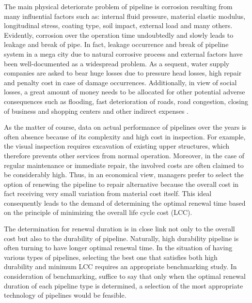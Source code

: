 \documentclass[a4paper,oneside,onecolumn,preprint,10pt,authoryear]{elsarticle}
\begin{document}
The main physical deteriorate problem of pipeline is corrosion resulting from many influential factors such as: internal fluid pressure, material elastic modulus, longitudinal stress, coating type, soil impact, external load and many others. Evidently, corrosion over the operation time undoubtedly and slowly leads to leakage and break of pipe. In fact, leakage occurrence and break of pipeline system in a mega city due to natural corrosive process and external factors have been well-documented as a widespread problem. As a sequent, water supply companies are asked to bear huge losses due to pressure head losses, high repair and penalty cost in case of damage occurrences. Additionally, in view of social losses, a great amount of money needs to be allocated for other potential adverse consequences such as flooding, fast deterioration of roads, road congestion, closing of business and shopping centers and other indirect expenses \cite{deb03}.

As the matter of course, data on actual performance of pipelines over the years is often absence because of its complexity and high cost in inspection. For example, the visual inspection requires excavation of existing upper structures, which therefore prevents other services from normal operation. Moreover, in the case of regular maintenance or immediate repair, the involved costs are often claimed to be considerably high. Thus, in an economical view, managers prefer to select the option of renewing the pipeline to repair alternative because the overall cost in fact receiving very small variation from material cost itself. This ideal consequently leads to the demand of determining the optimal renewal time based on the principle of minimizing the overall life cycle cost (LCC).

The determination for renewal duration is in close link not only to the overall cost but also to the durability of pipeline. Naturally, high durability pipeline is often turning to have longer optimal renewal time. In the situation of having various types of pipelines, selecting the best one that satisfies both high durability and minimum LCC requires an appropriate benchmarking study. In consideration of benchmarking, suffice to say that only when the optimal renewal duration of each pipeline type is determined, a selection of the most appropriate technology of pipelines would be feasible.
\end{document}
